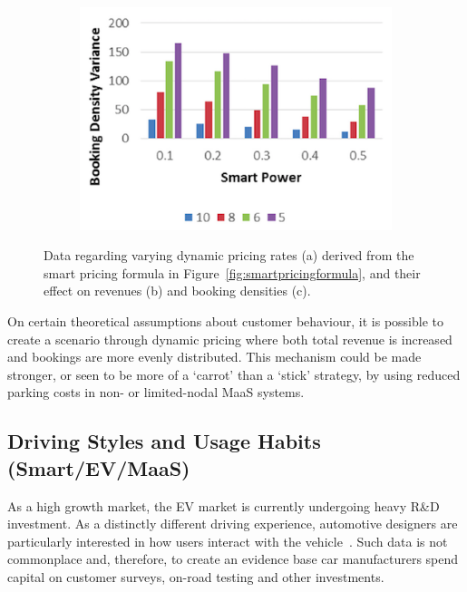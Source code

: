 \documentclass[b5paper,10pt]{article}
\begin{document}
\begin{figure}
\begin{subfigure}[b]{0.6\textwidth}
  \includegraphics[width=\textwidth]{images/smartpricegraph3.png}
        \caption{}
        \label{fig:smartbookingdensities}
\end{subfigure}
\caption{Data regarding varying dynamic pricing rates (a) derived
from the smart pricing formula in
Figure~\ref{fig:smartpricingformula}, and their effect on revenues
(b) and booking densities (c).}
\label{fig:smartpricegraphs}
\end{figure}


On certain theoretical assumptions about customer behaviour,
it is possible to create a scenario through dynamic pricing where both
total revenue is increased and bookings are more evenly
distributed. This mechanism could be made stronger, or seen to be more
of a `carrot' than a `stick' strategy, by using reduced parking costs
in non- or limited-nodal MaaS systems.

\subsection{Driving Styles and Usage Habits (Smart/EV/MaaS)} 

As a high growth market, the EV market is currently undergoing heavy
R\&D investment. As a distinctly different driving experience,
automotive designers are particularly interested in how users interact
with the vehicle~\citep{ferreira-et-al:2013}. Such data is not
commonplace and, therefore, to create an evidence base car
manufacturers spend capital on customer surveys, on-road testing and
other investments.
\end{document}
